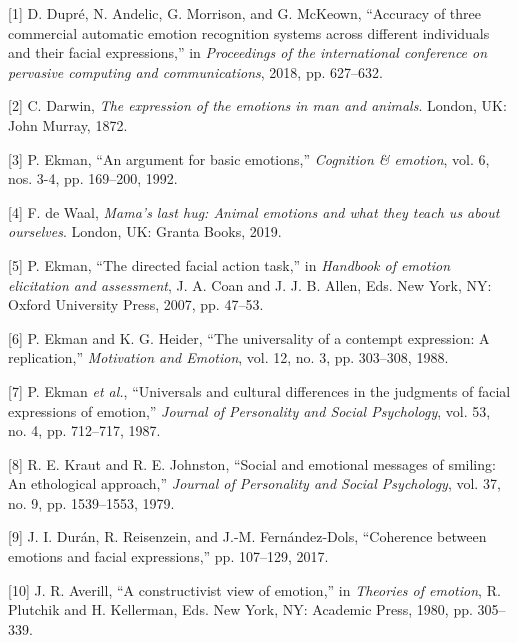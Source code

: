 \documentclass[conference,final,]{IEEEtran}
\begin{document}
\hypertarget{refs}{}
\leavevmode\hypertarget{ref-dupre2018accuracy}{}%
{[}1{]} D. Dupré, N. Andelic, G. Morrison, and G. McKeown, ``Accuracy of
three commercial automatic emotion recognition systems across different
individuals and their facial expressions,'' in \emph{Proceedings of the
international conference on pervasive computing and communications},
2018, pp. 627--632.

\leavevmode\hypertarget{ref-darwin1872expression}{}%
{[}2{]} C. Darwin, \emph{The expression of the emotions in man and
animals}. London, UK: John Murray, 1872.

\leavevmode\hypertarget{ref-ekman1992argument}{}%
{[}3{]} P. Ekman, ``An argument for basic emotions,'' \emph{Cognition \&
emotion}, vol. 6, nos. 3-4, pp. 169--200, 1992.

\leavevmode\hypertarget{ref-de2019mama}{}%
{[}4{]} F. de Waal, \emph{Mama's last hug: Animal emotions and what they
teach us about ourselves}. London, UK: Granta Books, 2019.

\leavevmode\hypertarget{ref-ekman2007directed}{}%
{[}5{]} P. Ekman, ``The directed facial action task,'' in \emph{Handbook
of emotion elicitation and assessment}, J. A. Coan and J. J. B. Allen,
Eds. New York, NY: Oxford University Press, 2007, pp. 47--53.

\leavevmode\hypertarget{ref-ekman1988universality}{}%
{[}6{]} P. Ekman and K. G. Heider, ``The universality of a contempt
expression: A replication,'' \emph{Motivation and Emotion}, vol. 12, no.
3, pp. 303--308, 1988.

\leavevmode\hypertarget{ref-ekman1987universals}{}%
{[}7{]} P. Ekman \emph{et al.}, ``Universals and cultural differences in
the judgments of facial expressions of emotion,'' \emph{Journal of
Personality and Social Psychology}, vol. 53, no. 4, pp. 712--717, 1987.

\leavevmode\hypertarget{ref-kraut1979social}{}%
{[}8{]} R. E. Kraut and R. E. Johnston, ``Social and emotional messages
of smiling: An ethological approach,'' \emph{Journal of Personality and
Social Psychology}, vol. 37, no. 9, pp. 1539--1553, 1979.

\leavevmode\hypertarget{ref-duran2017coherence}{}%
{[}9{]} J. I. Durán, R. Reisenzein, and J.-M. Fernández-Dols,
``Coherence between emotions and facial expressions,'' pp. 107--129,
2017.

\leavevmode\hypertarget{ref-averill1980constructivist}{}%
{[}10{]} J. R. Averill, ``A constructivist view of emotion,'' in
\emph{Theories of emotion}, R. Plutchik and H. Kellerman, Eds. New York,
NY: Academic Press, 1980, pp. 305--339.
\end{document}
